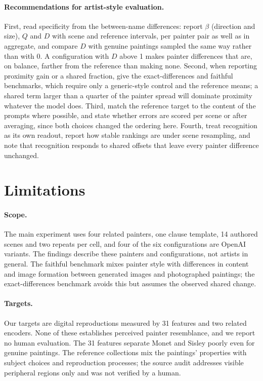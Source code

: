 \documentclass[10pt]{article}
\begin{document}
\paragraph{Recommendations for artist-style evaluation.}
First, read specificity from the between-name differences: report $\beta$ (direction and size),
$Q$ and $D$ with scene and reference intervals, per painter pair as well as in aggregate, and
compare $D$ with genuine paintings sampled the same way rather than with 0. A configuration with
$D$ above 1 makes painter differences that are, on balance, farther from the reference than making
none. Second, when reporting proximity gain or a shared fraction, give the exact-differences and
faithful benchmarks, which require only a generic-style control and the reference means; a shared
term larger than a quarter of the painter spread will dominate proximity whatever the model does.
Third, match the reference target to the content of the prompts where possible, and state whether
errors are scored per scene or after averaging, since both choices changed the ordering here.
Fourth, treat recognition as its own readout, report how stable rankings are under scene
resampling, and note that recognition responds to shared offsets that leave every painter
difference unchanged.

\section{Limitations}\label{sec:limitations}

\paragraph{Scope.} The main experiment uses four related painters, one clause template, 14 authored
scenes and two repeats per cell, and four of the six configurations are OpenAI variants. The
findings describe these painters and configurations, not artists in general. The faithful benchmark
mixes painter style with differences in content and image formation between generated images and
photographed paintings; the exact-differences benchmark avoids this but assumes the observed shared
change.

\paragraph{Targets.} Our targets are digital reproductions measured by 31 features and two related
encoders. None of these establishes perceived painter resemblance, and we report no human
evaluation. The 31 features separate Monet and Sisley poorly even for genuine paintings. The
reference collections mix the paintings' properties with subject choices and reproduction
processes; the source audit addresses visible peripheral regions only and was not verified by a
human.
\end{document}
